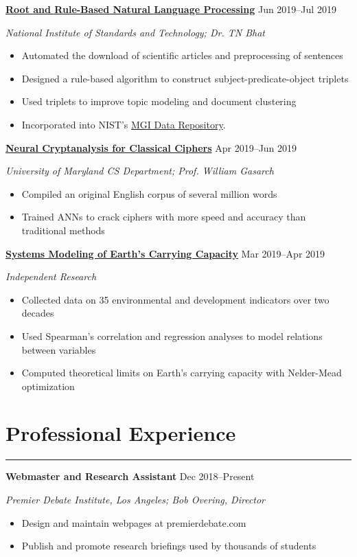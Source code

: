 \documentclass[11pt]{article}
\newcommand{\resumesection}[1]{\vspace{-0.3cm}\section*{\color{highlight}#1}\vspace{-0.3cm}\hrule\vspace{0.3cm}}
\begin{document}
\textbf{\href{https://github.com/petezh/Root-and-Rule-NLP}{Root and Rule-Based Natural Language Processing}} \hfill Jun 2019--Jul 2019\par
\textit{National Institute of Standards and Technology; Dr. TN Bhat}
\begin{itemize}
	\item Automated the download of scientific articles and preprocessing of sentences
	\item Designed a rule-based algorithm to construct subject-predicate-object triplets
	\item Used triplets to improve topic modeling and document clustering
	\item Incorporated into NIST's \href{https://randr.nist.gov/mgi/default.aspx}{MGI Data Repository}.
\end{itemize}\vspace{0.1cm}

\textbf{\href{https://github.com/petezh/Neural-Cryptanalysis}{Neural Cryptanalysis for Classical Ciphers}} \hfill Apr 2019--Jun 2019\par
\textit{University of Maryland CS Department; Prof. William Gasarch}
\begin{itemize}
	\item Compiled an original English corpus of several million words
	\item Trained ANNs to crack ciphers with more speed and accuracy than traditional methods
\end{itemize}\vspace{0.1cm}

\textbf{\href{https://github.com/gautomdas/IMMC-World4}{Systems Modeling of Earth's Carrying Capacity}} \hfill Mar 2019--Apr 2019\par
\textit{Independent Research}
\begin{itemize}
	\item Collected data on 35 environmental and development indicators over two decades
	\item Used Spearman's correlation and regression analyses to model relations between variables
	\item Computed theoretical limits on Earth's carrying capacity with Nelder-Mead optimization
\end{itemize}



\resumesection{Professional Experience}

\textbf{Webmaster and Research Assistant}   \hfill Dec 2018--Present \par
\textit{Premier Debate Institute, Los Angeles; Bob Overing, Director}
\begin{itemize}
	\item Design and maintain webpages at premierdebate.com
	\item Publish and promote research briefings used by thousands of students
\end{itemize}
\end{document}
